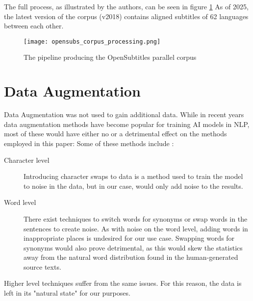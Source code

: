 The full process, as illustrated by the authors, can be seen in figure \ref{fig:opensubs pipeline}
As of 2025, the latest version of the corpus (v2018) contains aligned subtitles of 62 languages between each other.

\begin{figure}[H]
	\centering
    \texttt{[image: opensubs\_corpus\_processing.png]}
	\caption{The pipeline producing the OpenSubtitles parallel corpus}
    \label{fig:opensubs pipeline}
\end{figure}


\section{Data Augmentation}
Data Augmentation was not used to gain additional data.
While in recent years data augmentation methods have become popular for training AI models in NLP, most of these would have either no or a detrimental effect on the methods employed in this paper:
Some of these methods include \cite{pellicerDataAugmentationTechniques2023}:
\begin{description}
	\item[Character level]
	      Introducing character swaps to data is a method used to train the model to noise in the data, but in our case, would only add noise to the results.
	\item[Word level]
	      There exist techniques to switch words for synonyms or swap words in the sentences to create noise.
	      As with noise on the word level, adding words in inappropriate places is undesired for our use case.
	      Swapping words for synonyms would also prove detrimental, as this would skew the statistics away from the natural word distribution found in the human-generated source texts.
\end{description}
Higher level techniques suffer from the same issues.
For this reason, the data is left in its "natural state" for our purposes.

